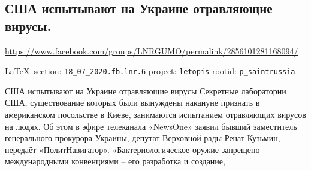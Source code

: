  
 
  
\subsection{США испытывают на Украине отравляющие вирусы.}
\url{https://www.facebook.com/groups/LNRGUMO/permalink/2856101281168094/}

\vspace{0.5cm}
{\small\LaTeX~section: \verb|18_07_2020.fb.lnr.6| project: \verb|letopis| rootid: \verb|p_saintrussia|}
\vspace{0.5cm}

США испытывают на Украине отравляющие вирусы Секретные лаборатории США,
существование которых были вынуждены накануне признать в американском
посольстве в Киеве, занимаются испытанием отравляющих вирусов на людях. Об этом
в эфире телеканала «NewsOne» заявил бывший заместитель генерального прокурора
Украины, депутат Верховной рады Ренат Кузьмин, передаёт «ПолитНавигатор».
«Бактериологическое оружие запрещено международными конвенциями – его
разработка и создание, 
